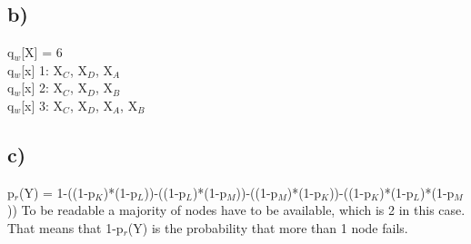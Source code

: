 \documentclass{scrartcl}
\begin{document}
\subsection*{b)}
q$_w$[X] = 6\\
q$_w$[x] 1: X$_C$, X$_D$, X$_A$\\
q$_w$[x] 2: X$_C$, X$_D$, X$_B$\\
q$_w$[x] 3: X$_C$, X$_D$, X$_A$, X$_B$\\


\subsection*{c)}
p$_r$(Y) = 1-((1-p$_K$)*(1-p$_L$))-((1-p$_L$)*(1-p$_M$))-((1-p$_M$)*(1-p$_K$))-((1-p$_K$)*(1-p$_L$)*(1-p$_M$))
To be readable a majority of nodes have to be available, which is 2 in this case. That means that 1-p$_r$(Y) is the probability that more than 1 node fails.
\end{document}
